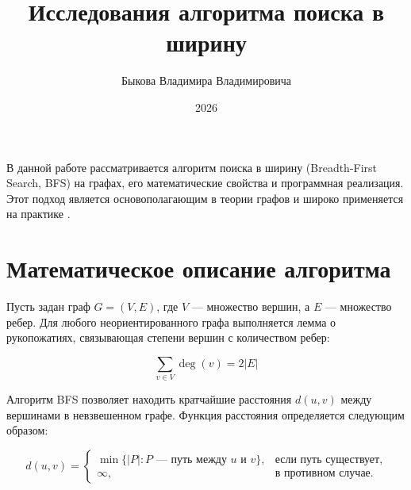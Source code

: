 \documentclass[coursework]{SCWorks}
\begin{document}

\title{Исследования алгоритма поиска в ширину}





\author{Быкова Владимира Владимировича}




\date{2026}

\maketitle

\secNumbering

\tableofcontents

\intro

В данной работе рассматривается алгоритм поиска в ширину
(Breadth-First Search, BFS) на графах, его математические
свойства и программная реализация. Этот подход является
основополагающим в теории графов и широко применяется
на практике \cite{cormen}.

\section{Математическое описание алгоритма}

Пусть задан граф $G = (V, E)$, где $V$ --- множество
вершин, а $E$ --- множество ребер. Для любого
неориентированного графа выполняется лемма о рукопожатиях,
связывающая степени вершин с количеством ребер:

\begin{equation}
\label{eq:degsum}
\sum_{v \in V} \deg(v) = 2|E|
\end{equation}

Алгоритм BFS позволяет находить кратчайшие расстояния
$d(u, v)$ между вершинами в невзвешенном графе.
Функция расстояния определяется следующим образом:

\begin{equation}
\label{eq:distance}
d(u, v) =
\begin{cases}
\min \{ |P| : P \text{ --- путь между } u \text{ и } v \},
& \text{если путь существует}, \\
\infty, & \text{в противном случае}.
\end{cases}
\end{equation}
\end{document}
